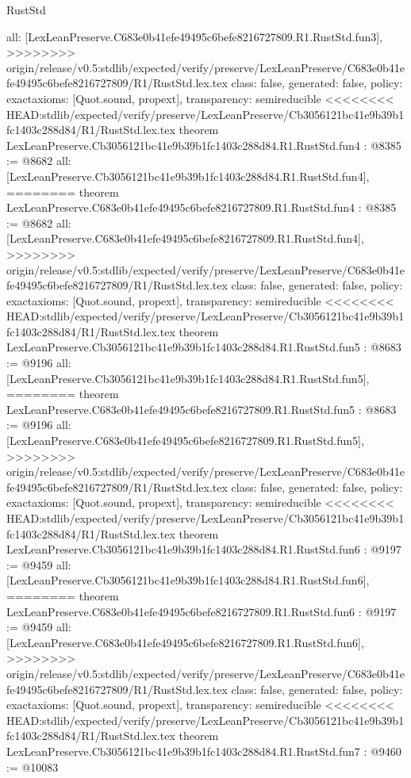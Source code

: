 \begin{lexlean}{RustStd}
\begin{coremodule}
{\begin{coremodule}
{{{{{{{  all: [LexLeanPreserve.C683e0b41efe49495c6befe8216727809.R1.RustStd.fun3],
>>>>>>>> origin/release/v0.5:stdlib/expected/verify/preserve/LexLeanPreserve/C683e0b41efe49495c6befe8216727809/R1/RustStd.lex.tex
  class: false,
  generated: false,
  policy: exact{axioms: [Quot.sound, propext]},
  transparency: semireducible
}
<<<<<<<< HEAD:stdlib/expected/verify/preserve/LexLeanPreserve/Cb3056121bc41e9b39b1fc1403c288d84/R1/RustStd.lex.tex
theorem LexLeanPreserve.Cb3056121bc41e9b39b1fc1403c288d84.R1.RustStd.fun4 : @8385 := @8682 {
  all: [LexLeanPreserve.Cb3056121bc41e9b39b1fc1403c288d84.R1.RustStd.fun4],
========
theorem LexLeanPreserve.C683e0b41efe49495c6befe8216727809.R1.RustStd.fun4 : @8385 := @8682 {
  all: [LexLeanPreserve.C683e0b41efe49495c6befe8216727809.R1.RustStd.fun4],
>>>>>>>> origin/release/v0.5:stdlib/expected/verify/preserve/LexLeanPreserve/C683e0b41efe49495c6befe8216727809/R1/RustStd.lex.tex
  class: false,
  generated: false,
  policy: exact{axioms: [Quot.sound, propext]},
  transparency: semireducible
}
<<<<<<<< HEAD:stdlib/expected/verify/preserve/LexLeanPreserve/Cb3056121bc41e9b39b1fc1403c288d84/R1/RustStd.lex.tex
theorem LexLeanPreserve.Cb3056121bc41e9b39b1fc1403c288d84.R1.RustStd.fun5 : @8683 := @9196 {
  all: [LexLeanPreserve.Cb3056121bc41e9b39b1fc1403c288d84.R1.RustStd.fun5],
========
theorem LexLeanPreserve.C683e0b41efe49495c6befe8216727809.R1.RustStd.fun5 : @8683 := @9196 {
  all: [LexLeanPreserve.C683e0b41efe49495c6befe8216727809.R1.RustStd.fun5],
>>>>>>>> origin/release/v0.5:stdlib/expected/verify/preserve/LexLeanPreserve/C683e0b41efe49495c6befe8216727809/R1/RustStd.lex.tex
  class: false,
  generated: false,
  policy: exact{axioms: [Quot.sound, propext]},
  transparency: semireducible
}
<<<<<<<< HEAD:stdlib/expected/verify/preserve/LexLeanPreserve/Cb3056121bc41e9b39b1fc1403c288d84/R1/RustStd.lex.tex
theorem LexLeanPreserve.Cb3056121bc41e9b39b1fc1403c288d84.R1.RustStd.fun6 : @9197 := @9459 {
  all: [LexLeanPreserve.Cb3056121bc41e9b39b1fc1403c288d84.R1.RustStd.fun6],
========
theorem LexLeanPreserve.C683e0b41efe49495c6befe8216727809.R1.RustStd.fun6 : @9197 := @9459 {
  all: [LexLeanPreserve.C683e0b41efe49495c6befe8216727809.R1.RustStd.fun6],
>>>>>>>> origin/release/v0.5:stdlib/expected/verify/preserve/LexLeanPreserve/C683e0b41efe49495c6befe8216727809/R1/RustStd.lex.tex
  class: false,
  generated: false,
  policy: exact{axioms: [Quot.sound, propext]},
  transparency: semireducible
}
<<<<<<<< HEAD:stdlib/expected/verify/preserve/LexLeanPreserve/Cb3056121bc41e9b39b1fc1403c288d84/R1/RustStd.lex.tex
theorem LexLeanPreserve.Cb3056121bc41e9b39b1fc1403c288d84.R1.RustStd.fun7 : @9460 := @10083 {
}}}}}}}}}}
\end{coremodule}}
\end{coremodule}
\end{lexlean}
